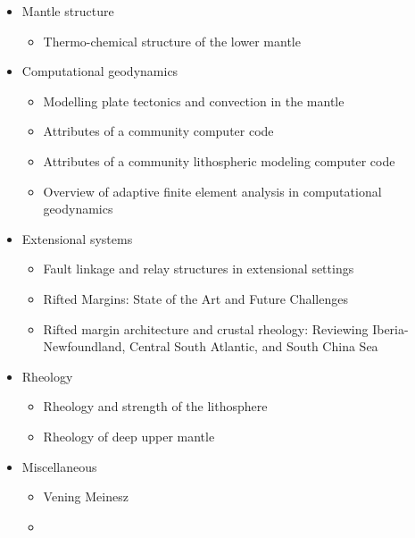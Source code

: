 \begin{itemize}
\item Mantle structure
   \begin{itemize}
   \item Thermo-chemical structure of the lower mantle \cite{dett07}
   \end{itemize}


\item Computational geodynamics
   \begin{itemize}
   \item Modelling plate tectonics and convection in the mantle \cite{mogz00}
   \item Attributes of a community computer code \cite{comc15}
   \item Attributes of a community lithospheric modeling computer code \cite{comc15}
   \item Overview of adaptive finite element analysis in computational geodynamics \cite{masm13}
   \end{itemize}

\item Extensional systems
   \begin{itemize}
   \item Fault linkage and relay structures in extensional settings \cite{foro16}
   \item Rifted Margins: State of the Art and Future Challenges \cite{pema19}\\
   \item Rifted margin architecture and crustal rheology: Reviewing
Iberia-Newfoundland, Central South Atlantic, and South China Sea \cite{brhc17}
   \end{itemize}

\item Rheology
   \begin{itemize}
   \item Rheology and strength of the lithosphere \cite{kirb83,buro11}
   \item Rheology of deep upper mantle \cite{kara10}
   \end{itemize}

\item Miscellaneous
   \begin{itemize}
   \item Vening Meinesz \cite{vlaa89}
   \item 
   \end{itemize}



\end{itemize}
